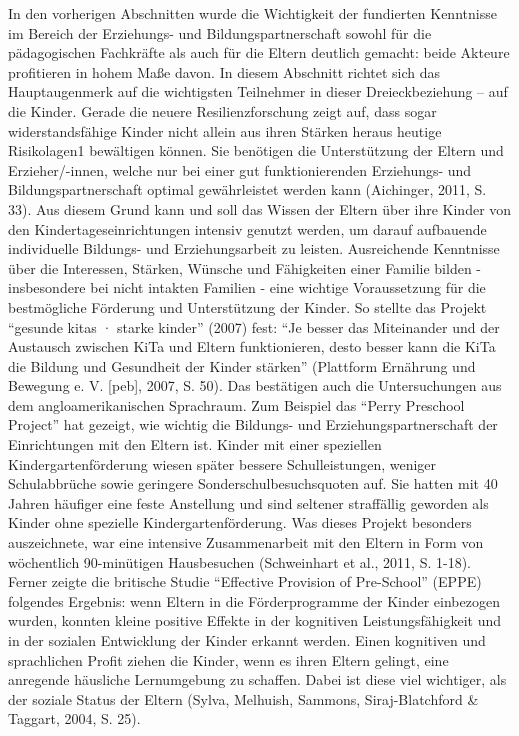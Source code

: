 \documentclass[12pt,a4paper]{article}
\begin{document}
In den vorherigen Abschnitten wurde die Wichtigkeit der fundierten Kenntnisse im Bereich der Erziehungs- und Bildungspartnerschaft sowohl für die pädagogischen Fachkräfte als auch für die Eltern deutlich gemacht: beide Akteure profitieren in hohem Maße davon. In diesem Abschnitt richtet sich das Hauptaugenmerk auf die wichtigsten Teilnehmer in dieser Dreieckbeziehung – auf die Kinder.
Gerade die neuere Resilienzforschung zeigt auf, dass sogar widerstandsfähige Kinder nicht allein aus ihren Stärken heraus heutige Risikolagen1 bewältigen können. Sie benötigen die Unterstützung der Eltern und Erzieher/-innen, welche nur bei einer gut funktionierenden Erziehungs- und Bildungspartnerschaft optimal gewährleistet werden kann (Aichinger, 2011, S. 33). Aus diesem Grund kann und soll das Wissen der Eltern über ihre Kinder von den Kindertageseinrichtungen intensiv genutzt werden, um darauf aufbauende individuelle Bildungs- und Erziehungsarbeit zu leisten. Ausreichende Kenntnisse über die Interessen, Stärken, Wünsche und Fähigkeiten einer Familie bilden - insbesondere bei nicht intakten Familien - eine wichtige Voraussetzung für die bestmögliche Förderung und Unterstützung der Kinder. 
	So stellte das Projekt "`gesunde kitas · starke kinder"' (2007) fest: "`Je besser das Miteinander und der Austausch zwischen KiTa und Eltern funktionieren, desto besser kann die KiTa die Bildung und Gesundheit der Kinder stärken"' (Plattform Ernährung und Bewegung e. V. [peb], 2007, S. 50). 
Das bestätigen auch die Untersuchungen aus dem angloamerikanischen Sprachraum. Zum Beispiel das "`Perry Preschool Project"' hat gezeigt, wie wichtig die Bildungs- und Erziehungspartnerschaft der Einrichtungen mit den Eltern ist. Kinder mit einer speziellen Kindergartenförderung wiesen später bessere Schulleistungen, weniger Schulabbrüche sowie geringere Sonderschulbesuchsquoten auf. Sie hatten mit 40 Jahren häufiger eine feste Anstellung und sind seltener straffällig geworden als Kinder ohne spezielle Kindergartenförderung. Was dieses Projekt besonders auszeichnete, war eine intensive Zusammenarbeit mit den Eltern in Form von wöchentlich 90-minütigen Hausbesuchen (Schweinhart et al., 2011, S. 1-18).
Ferner zeigte die britische Studie "`Effective Provision of Pre-School"' (EPPE) folgendes Ergebnis: wenn Eltern in die Förderprogramme der Kinder einbezogen wurden, konnten kleine positive Effekte in der kognitiven Leistungsfähigkeit und in der sozialen Entwicklung der Kinder erkannt werden. Einen kognitiven und sprachlichen Profit ziehen die Kinder, wenn es ihren Eltern gelingt, eine anregende häusliche Lernumgebung zu schaffen. Dabei ist diese viel wichtiger, als der soziale Status der Eltern (Sylva, Melhuish, Sammons, Siraj-Blatchford \& Taggart, 2004, S. 25).
\end{document}
